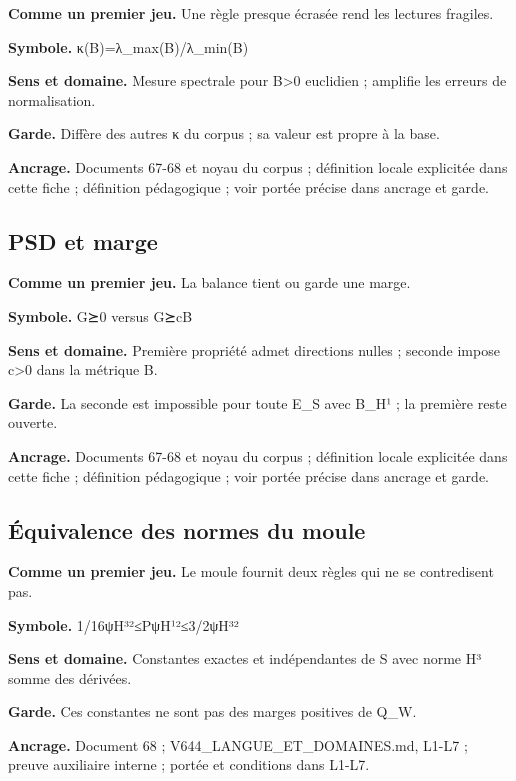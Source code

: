 \documentclass[
  9pt,
  a4paper,
]{article}
\begin{document}
\textbf{Comme un premier jeu.} Une règle presque écrasée rend les
lectures fragiles.

\textbf{Symbole.} κ(B)=λ\_max(B)/λ\_min(B)

\textbf{Sens et domaine.} Mesure spectrale pour B\textgreater0 euclidien
; amplifie les erreurs de normalisation.

\textbf{Garde.} Diffère des autres κ du corpus ; sa valeur est propre à
la base.

\textbf{Ancrage.} Documents 67-68 et noyau du corpus ; définition locale
explicitée dans cette fiche ; définition pédagogique ; voir portée
précise dans ancrage et garde.

\hypertarget{psd-et-marge}{%
\subsection{PSD et marge}\label{psd-et-marge}}

\textbf{Comme un premier jeu.} La balance tient ou garde une marge.

\textbf{Symbole.} G⪰0 versus G⪰cB

\textbf{Sens et domaine.} Première propriété admet directions nulles ;
seconde impose c\textgreater0 dans la métrique B.

\textbf{Garde.} La seconde est impossible pour toute E\_S avec B\_H¹ ;
la première reste ouverte.

\textbf{Ancrage.} Documents 67-68 et noyau du corpus ; définition locale
explicitée dans cette fiche ; définition pédagogique ; voir portée
précise dans ancrage et garde.

\hypertarget{uxe9quivalence-des-normes-du-moule}{%
\subsection{Équivalence des normes du
moule}\label{uxe9quivalence-des-normes-du-moule}}

\textbf{Comme un premier jeu.} Le moule fournit deux règles qui ne se
contredisent pas.

\textbf{Symbole.}
1/16\textbar\textbar ψ\textbar\textbar H³²≤\textbar\textbar Pψ\textbar\textbar H¹²≤3/2\textbar\textbar ψ\textbar\textbar H³²

\textbf{Sens et domaine.} Constantes exactes et indépendantes de S avec
norme H³ somme des dérivées.

\textbf{Garde.} Ces constantes ne sont pas des marges positives de Q\_W.

\textbf{Ancrage.} Document 68 ; V644\_LANGUE\_ET\_DOMAINES.md, L1-L7 ;
preuve auxiliaire interne ; portée et conditions dans L1-L7.
\end{document}
